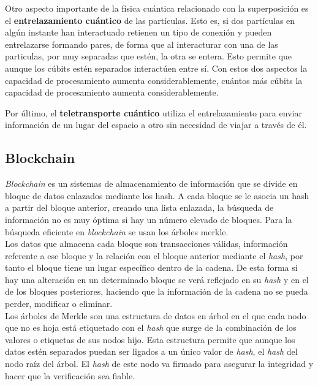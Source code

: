 Otro aspecto importante de la física cuántica relacionado con la superposición es el \textbf{entrelazamiento cuántico} de las partículas\cite{cumputacion-cuantica-clasica}. Esto es, si dos partículas en algún instante han interactuado retienen un tipo de conexión y pueden entrelazarse formando pares, de forma que al interacturar con una de las particulas, por muy separadas que estén, la otra se entera. Esto permite que aunque los cúbits estén separados interactúen entre sí. Con estos dos aspectos la capacidad de procesamiento aumenta considerablemente, cuántos más cúbits la capacidad de procesamiento aumenta considerablemente.

Por último, el \textbf{teletransporte cuántico} utiliza el entrelazamiento para enviar información de un lugar del espacio a otro sin necesidad de viajar a través de él.




\subsection{Blockchain}\label{sec:intro:blockchain}


\textit{Blockchain} es un sistemas de almacenamiento de información que se divide en bloque de datos enlazados mediante los hash. A cada bloque se le asocia un hash a partir del bloque anterior, creando una lista enlazada, la búsqueda de información no es muy óptima si hay un número elevado de bloques. Para la búsqueda eficiente en \textit{blockchain} se usan los árboles merkle.\\

Los datos que almacena cada bloque son transacciones válidas, información referente a ese bloque y la relación con el bloque anterior mediante el \textit{hash}, por tanto el bloque tiene un lugar específico dentro de la cadena. De esta forma si hay una alteración en un determinado bloque se verá reflejado en su \textit{hash} y en el de los bloques posteriores, haciendo que la información de la cadena no se pueda perder, modificar o eliminar.\\


Los árboles de Merkle \cite{arbol-merkle} son una estructura de datos en árbol en el que cada nodo que no es hoja está etiquetado con el \textit{hash} que surge de la combinación de los valores o etiquetas de sus nodos hijo. Esta estructura permite que aunque los datos estén separados puedan ser ligados a un único valor de \textit{hash}, el \textit{hash} del nodo raíz del árbol. El \textit{hash} de este nodo va firmado para asegurar la integridad y hacer que la verificación sea fiable. 

